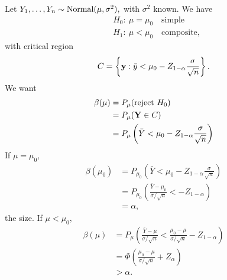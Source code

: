 \begin{eg}
\label{eg:normalpower}
Let $Y_1,\dots,Y_n\sim \operatorname*{Normal}(\mu,\sigma^2),$ with $\sigma^2$ known. We have
\begin{align*}
&H_0: \ \mu=\mu_0 \quad \text{simple}\\
&H_1: \ \mu<\mu_0 \quad \text{composite},
\end{align*}
with critical region
$$C=\left\{\mathbf y: \bar y <\mu_0-Z_{1-\alpha}\frac{\sigma}{\sqrt n}\right\}.$$
We want
\begin{align*}
    \beta(\mu)&=P_\mu(\text{reject } H_0)\\
    &=P_\mu(\mathbf Y\in C) \\
    &=P_\mu \left(\bar Y<\mu_0-Z_{1-\alpha}\frac{\sigma}{\sqrt n}\right)
\end{align*}
If $\mu=\mu_0,$
\begin{align*}
    \beta(\mu_0)&=P_{\mu_0}\left(\bar Y<\mu_0-Z_{1-\alpha}\frac{\sigma}{\sqrt n}\right) \\
    &=P_{\mu_0}\left(\frac{\bar Y-\mu_0}{\sigma/\sqrt n}<-Z_{1-\alpha}\right) \\
	&=\alpha,
\end{align*}
the size. If $\mu<\mu_0,$
\begin{align*}
    \beta(\mu)&=P_\mu\left(\frac{\bar Y-\mu}{\sigma/\sqrt n}<\frac{\mu_0-\mu}{\sigma/\sqrt n}-Z_{1-\alpha}\right)\\
    &=\Phi\left(\frac{\mu_0-\mu}{\sigma/\sqrt n}+Z_\alpha\right)\\
	&>\alpha.
\end{align*}
\end{eg}
